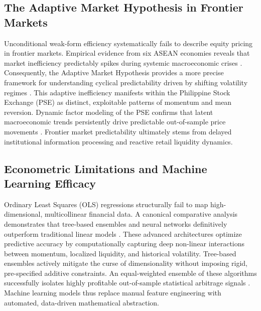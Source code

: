 \documentclass[12pt]{article}
\begin{document}
\subsection{The Adaptive Market Hypothesis in Frontier Markets}
Unconditional weak-form efficiency systematically fails to describe equity pricing in frontier markets. Empirical evidence from six ASEAN economies reveals that market inefficiency predictably spikes during systemic macroeconomic crises \parencite{huynh2025composite}. Consequently, the Adaptive Market Hypothesis provides a more precise framework for understanding cyclical predictability driven by shifting volatility regimes \parencite{ahmed2022adaptive}. This adaptive inefficiency manifests within the Philippine Stock Exchange (PSE) as distinct, exploitable patterns of momentum and mean reversion. Dynamic factor modeling of the PSE confirms that latent macroeconomic trends persistently drive predictable out-of-sample price movements \parencite{lim2026dynamic}. Frontier market predictability ultimately stems from delayed institutional information processing and reactive retail liquidity dynamics.

\subsection{Econometric Limitations and Machine Learning Efficacy}
Ordinary Least Squares (OLS) regressions structurally fail to map high-dimensional, multicollinear financial data. A canonical comparative analysis demonstrates that tree-based ensembles and neural networks definitively outperform traditional linear models \parencite{gu2020empirical}. These advanced architectures optimize predictive accuracy by computationally capturing deep non-linear interactions between momentum, localized liquidity, and historical volatility. Tree-based ensembles actively mitigate the curse of dimensionality without imposing rigid, pre-specified additive constraints. An equal-weighted ensemble of these algorithms successfully isolates highly profitable out-of-sample statistical arbitrage signals \parencite{krauss2017deep}. Machine learning models thus replace manual feature engineering with automated, data-driven mathematical abstraction.
\end{document}
